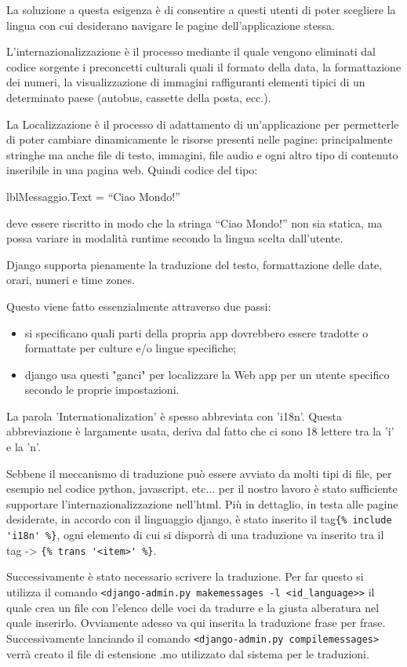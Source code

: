 La soluzione a questa esigenza è di consentire a questi utenti di poter scegliere la lingua con cui desiderano navigare le pagine dell’applicazione stessa.

L'internazionalizzazione è il processo mediante il quale vengono eliminati dal codice sorgente i preconcetti culturali quali il formato della data, la formattazione dei numeri, la visualizzazione di immagini raffiguranti elementi tipici di un determinato paese (autobus, cassette della posta, ecc.). 

La Localizzazione è il processo di adattamento di un’applicazione per permetterle di poter cambiare dinamicamente le risorse presenti nelle pagine: principalmente stringhe ma anche file di testo, immagini, file audio e ogni altro tipo di contenuto inseribile in una pagina web.
Quindi codice del tipo:

lblMessaggio.Text = “Ciao Mondo!”

deve essere riscritto in modo che la stringa “Ciao Mondo!” non sia statica, ma possa variare in modalità runtime secondo la lingua scelta dall’utente.

Django supporta pienamente la traduzione del testo, formattazione delle date, orari, numeri e  time zones.

Questo viene fatto essenzialmente attraverso due passi:
\begin{itemize}
	\item si specificano quali parti della propria app dovrebbero essere tradotte o formattate per culture e/o lingue specifiche;
	\item django usa questi "ganci" per localizzare la Web app per un utente specifico secondo le proprie impostazioni.
\end{itemize}

La parola 'Internationalization' è spesso abbreviata con 'i18n'. Questa abbreviazione è largamente usata, deriva dal fatto che ci sono 18 lettere tra la 'i' e la 'n'.

Sebbene il meccanismo di traduzione può essere avviato da molti tipi di file, per esempio nel codice python, javascript, etc... per il nostro lavoro è stato sufficiente supportare l'internazionalizzazione nell'html. Più in dettaglio, in testa alle pagine desiderate, in accordo con il linguaggio django, è stato inserito  il tag\lstinline${% include 'i18n' %}$, ogni elemento di cui si disporrà di una traduzione va inserito tra il tag -> \lstinline${% trans '<item>' %}$.

Successivamente è stato necessario scrivere la traduzione. Per far questo si utilizza il comando
\lstinline$<django-admin.py makemessages -l <id_language>>$
il quale crea un file con l'elenco delle voci da tradurre e la giusta alberatura  nel quale inserirlo. Ovviamente adesso va qui inserita la traduzione frase per frase. Successivamente lanciando il comando 
\lstinline$<django-admin.py compilemessages>$
verrà creato il file di estensione .mo utilizzato dal sistema per le traduzioni.

\endinput